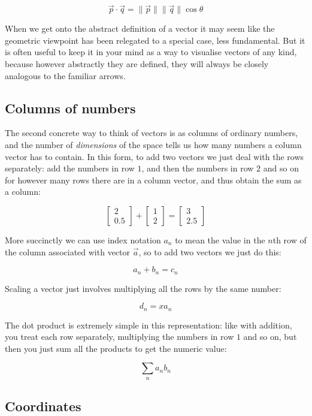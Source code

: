 $$
\vec{p}\cdot\vec{q} = \|\vec{p}\| \|\vec{q}\|\cos{\theta}
$$

When we get onto the abstract definition of a vector it may seem like the geometric viewpoint has been relegated to a special case, less fundamental. But it is often useful to keep it in your mind as a way to visualise vectors of any kind, because however abstractly they are defined, they will always be closely analogous to the familiar arrows.

\subsection{Columns of numbers}

The second concrete way to think of vectors is as columns of ordinary numbers, and the number of \textit{dimensions} of the space tells us how many numbers a column vector has to contain. In this form, to add two vectors we just deal with the rows separately: add the numbers in row $1$, and then the numbers in row $2$ and so on for however many rows there are in a column vector, and thus obtain the sum as a column:

$$
\begin{bmatrix}2 \\ 0.5\end{bmatrix} +
\begin{bmatrix}1 \\ 2\end{bmatrix} =
\begin{bmatrix}3 \\ 2.5\end{bmatrix}
$$

More succinctly we can use index notation $a_n$ to mean the value in the $n$th row of the column associated with vector $\vec{a}$, so to add two vectors we just do this:

$$
a_n + b_n = c_n
$$

Scaling a vector just involves multiplying all the rows by the same number:

$$
d_n = x a_n
$$

The dot product is extremely simple in this representation: like with addition, you treat each row separately, multiplying the numbers in row $1$ and so on, but then you just sum all the products to get the numeric value:

$$
\sum_n a_n b_n
$$

\subsection{Coordinates}

